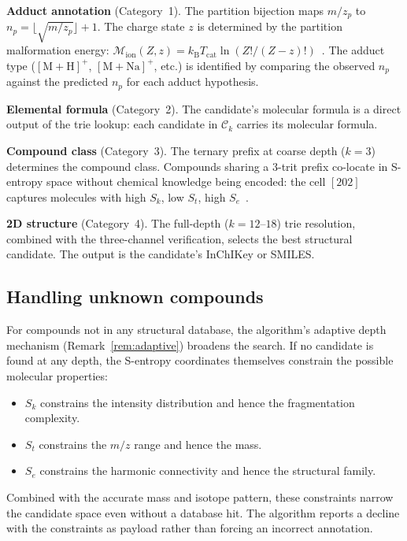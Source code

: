 \documentclass[twocolumn,10pt,a4paper]{article}
\theoremstyle{thmstyle}
\theoremstyle{definition}
\theoremstyle{remark}
\newcommand{\kB}{k_{\mathrm{B}}}
\newcommand{\Sk}{S_{k}}
\newcommand{\St}{S_{t}}
\newcommand{\Se}{S_{e}}
\newcommand{\calC}{\mathcal{C}}
\begin{document}
\textbf{Adduct annotation} (Category~1). The partition bijection maps
$m/z_p$ to $n_p = \lfloor\sqrt{m/z_p}\rfloor + 1$. The charge state
$z$ is determined by the partition malformation energy:
$\mathcal{M}_{\mathrm{ion}}(Z, z) = \kB T_{\mathrm{cat}}
\ln(Z!/(Z-z)!)$~\citep{sachikonye2024partition}. The adduct type
($[\mathrm{M}+\mathrm{H}]^+$, $[\mathrm{M}+\mathrm{Na}]^+$, etc.)
is identified by comparing the observed $n_p$ against the predicted
$n_p$ for each adduct hypothesis.

\textbf{Elemental formula} (Category~2). The candidate's molecular
formula is a direct output of the trie lookup: each candidate in
$\calC_k$ carries its molecular formula.

\textbf{Compound class} (Category~3). The ternary prefix at coarse
depth ($k = 3$) determines the compound class. Compounds sharing a
3-trit prefix co-locate in S-entropy space without chemical knowledge
being encoded: the cell $[202]$ captures molecules with high $\Sk$,
low $\St$, high $\Se$~\citep{sachikonye2024generative}.

\textbf{2D structure} (Category~4). The full-depth ($k = 12$--$18$)
trie resolution, combined with the three-channel verification, selects
the best structural candidate. The output is the candidate's InChIKey
or SMILES.

\subsection{Handling unknown compounds}

For compounds not in any structural database, the algorithm's adaptive
depth mechanism (Remark~\ref{rem:adaptive}) broadens the search. If no
candidate is found at any depth, the S-entropy coordinates themselves
constrain the possible molecular properties:
\begin{itemize}[nosep]
\item $\Sk$ constrains the intensity distribution and hence the
  fragmentation complexity.
\item $\St$ constrains the $m/z$ range and hence the mass.
\item $\Se$ constrains the harmonic connectivity and hence the
  structural family.
\end{itemize}
Combined with the accurate mass and isotope pattern, these constraints
narrow the candidate space even without a database hit. The algorithm
reports a decline with the constraints as payload rather than forcing
an incorrect annotation.
\end{document}
